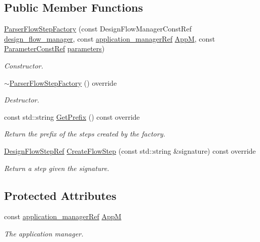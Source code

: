 \subsection*{Public Member Functions}
\begin{DoxyCompactItemize}
\item 
\hyperlink{classParserFlowStepFactory_a65c6ce254962ed217803558733cf14f6}{Parser\+Flow\+Step\+Factory} (const Design\+Flow\+Manager\+Const\+Ref \hyperlink{classDesignFlowStepFactory_ae7854875d87ed8d2fb4d82b2fa017b79}{design\+\_\+flow\+\_\+manager}, const \hyperlink{application__manager_8hpp_a04ccad4e5ee401e8934306672082c180}{application\+\_\+manager\+Ref} \hyperlink{classParserFlowStepFactory_af7ef2990d585dcc365246ae9c5412979}{AppM}, const \hyperlink{Parameter_8hpp_a37841774a6fcb479b597fdf8955eb4ea}{Parameter\+Const\+Ref} \hyperlink{classDesignFlowStepFactory_ab2c8bba23db9f4066e1a27ee7157c2de}{parameters})
\begin{DoxyCompactList}\small\item\em Constructor. \end{DoxyCompactList}\item 
\hyperlink{classParserFlowStepFactory_a7bbc091d8b81aed1892f4ce794961431}{$\sim$\+Parser\+Flow\+Step\+Factory} () override
\begin{DoxyCompactList}\small\item\em Destructor. \end{DoxyCompactList}\item 
const std\+::string \hyperlink{classParserFlowStepFactory_adc4d59c9d264adc657113b5991cdf47f}{Get\+Prefix} () const override
\begin{DoxyCompactList}\small\item\em Return the prefix of the steps created by the factory. \end{DoxyCompactList}\item 
\hyperlink{design__flow__step_8hpp_a9dd6b4474ddf52d41a78b1aaa12ae6c8}{Design\+Flow\+Step\+Ref} \hyperlink{classParserFlowStepFactory_a694b513efdd4a039212c4ce072ceb8f4}{Create\+Flow\+Step} (const std\+::string \&signature) const override
\begin{DoxyCompactList}\small\item\em Return a step given the signature. \end{DoxyCompactList}\end{DoxyCompactItemize}
\subsection*{Protected Attributes}
\begin{DoxyCompactItemize}
\item 
const \hyperlink{application__manager_8hpp_a04ccad4e5ee401e8934306672082c180}{application\+\_\+manager\+Ref} \hyperlink{classParserFlowStepFactory_af7ef2990d585dcc365246ae9c5412979}{AppM}
\begin{DoxyCompactList}\small\item\em The application manager. \end{DoxyCompactList}\end{DoxyCompactItemize}


